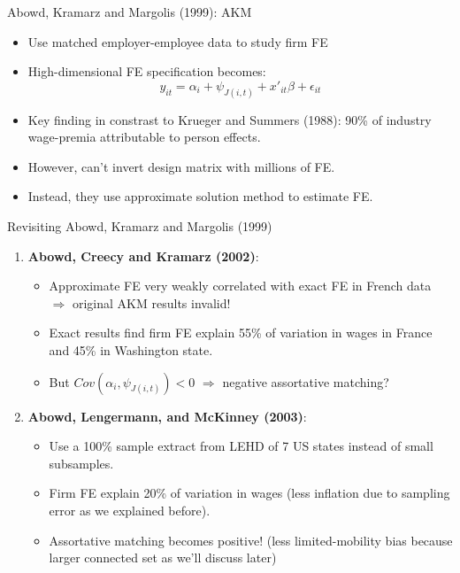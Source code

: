 \documentclass[notes=show]{beamer}
\begin{document}
\begin{frame}{Abowd, Kramarz and Margolis (1999): AKM}
\begin{itemize}
    \item Use matched employer-employee data to study firm FE \medskip
    \item High-dimensional FE specification becomes:
    \begin{equation*}
        y_{it} = \alpha_i + \psi_{J(i,t)} + x'_{it}\beta + \epsilon_{it}
    \end{equation*}
    \item Key finding in constrast to Krueger and Summers (1988): 90\% of industry wage-premia attributable to person effects. \medskip
    \item However, can't invert design matrix with millions of FE. \medskip
    \item Instead, they use approximate solution method to estimate FE. 
\end{itemize}
\end{frame}

\begin{frame}{Revisiting Abowd, Kramarz and Margolis (1999)}
\begin{enumerate}
    \item \textbf{Abowd, Creecy and Kramarz (2002)}:
    \begin{itemize}
        \item Approximate FE very weakly correlated with exact FE in French data $ \Rightarrow$ original AKM results invalid! \smallskip
        \item Exact results find firm FE explain 55\% of variation in wages in France and 45\% in Washington state. \smallskip
        \item But $ Cov(\alpha_{i},\psi_{J(i,t)}) <0$ $\Rightarrow$ negative assortative matching?
    \end{itemize}
    \item \textbf{Abowd, Lengermann, and McKinney (2003)}:
    \begin{itemize}
        \item Use a 100\% sample extract from LEHD of 7 US states instead of small subsamples. \smallskip
        \item Firm FE explain 20\% of variation in wages (less inflation due to sampling error as we explained before). \smallskip
        \item Assortative matching becomes positive! (less limited-mobility bias because larger connected set as we'll discuss later)
    \end{itemize}
\end{enumerate}
\end{frame}
\end{document}
